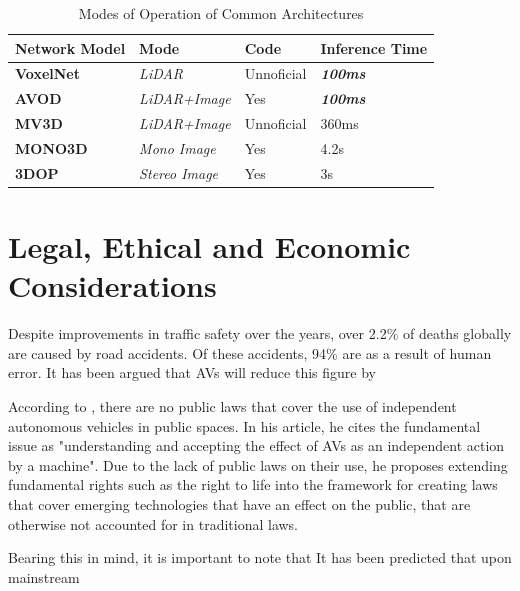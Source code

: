 \begin{table}[h]
	\centering
	\begin{tabular}{|l|l|l|l|}
		\hline
		\textbf{Network Model} & \textbf{Mode}         & \textbf{Code} & \textbf{Inference Time}  \\ \hline
		\textbf{VoxelNet}      & \textit{LiDAR}        & Unnoficial    & \textit{\textbf{100ms}} \\ \hline
		\textbf{AVOD}          & \textit{LiDAR+Image}  & Yes           & \textit{\textbf{100ms}} \\ \hline
		\textbf{MV3D}          & \textit{LiDAR+Image}  & Unnoficial    & 360ms                   \\ \hline
		\textbf{MONO3D}        & \textit{Mono Image}   & Yes           & 4.2s                    \\ \hline
		\textbf{3DOP}          & \textit{Stereo Image} & Yes           & 3s                      \\ \hline
	\end{tabular}
	\caption{Modes of Operation of Common Architectures}
	\label{tab:arch}
\end{table}







\section{Legal, Ethical and Economic Considerations}


Despite improvements in traffic safety over the years, over  2.2$\%$ of deaths globally are caused by road accidents. Of these accidents, 94$\%$ are as a result of human error. It has been argued that AVs will reduce this figure by 

According to \cite{gasser2016fundamental}, there are no public laws that cover the  use of independent autonomous vehicles in public spaces. In his article, he cites the fundamental issue as "understanding and accepting the effect of AVs as an independent action by a machine". Due to the lack of public laws on their use, he proposes extending fundamental rights such as the right to life into the framework for creating laws that cover emerging technologies that have an effect on the public, that are otherwise not accounted for in traditional laws.

 
Bearing this in mind, it is important to note that  It has been predicted that upon mainstream 

